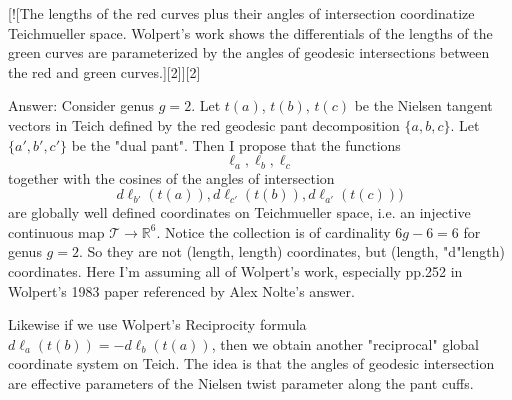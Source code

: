 \documentclass[12pt]{article}
\theoremstyle{definition}
\theoremstyle{remark}
\newcommand{\bR}{\mathbb{R}}
\newcommand{\sT}{\mathscr{T}}
\begin{document}
[![The lengths of the red curves plus their angles of intersection coordinatize Teichmueller space. Wolpert's work shows the differentials of the lengths of the green curves are parameterized by the angles of geodesic intersections between the red and green curves.][2]][2]

Answer: Consider genus $g=2$. Let $t(a)$, $t(b)$, $t(c)$ be the Nielsen tangent vectors in Teich defined by the red geodesic pant decomposition $\{a,b,c\}$. Let $\{a', b', c'\}$ be the "dual pant". Then I propose that the functions $$\ell_a, \ell_b,\ell_c$$ together with the cosines of the angles of intersection 
 $$d\ell_{b'}(t(a)), d\ell_{c'}( t(b)), d\ell_{a'}(t(c)))$$
are globally well defined coordinates on Teichmueller space, i.e. an injective continuous map $\sT \to \bR^6$. Notice the collection is of cardinality $6g-6=6$ for genus $g=2$. So they are not (length, length) coordinates, but (length, "d"length) coordinates. Here I'm assuming all of Wolpert's work, especially pp.252 in Wolpert's 1983 paper referenced by Alex Nolte's answer. 

Likewise if we use Wolpert's Reciprocity formula $d \ell_a (t(b))=-d\ell_b(t(a))$, then we obtain another "reciprocal" global coordinate system on Teich. The idea is that the angles of geodesic intersection are effective parameters of the Nielsen twist parameter along the pant cuffs.




\printbibliography
\end{document}
